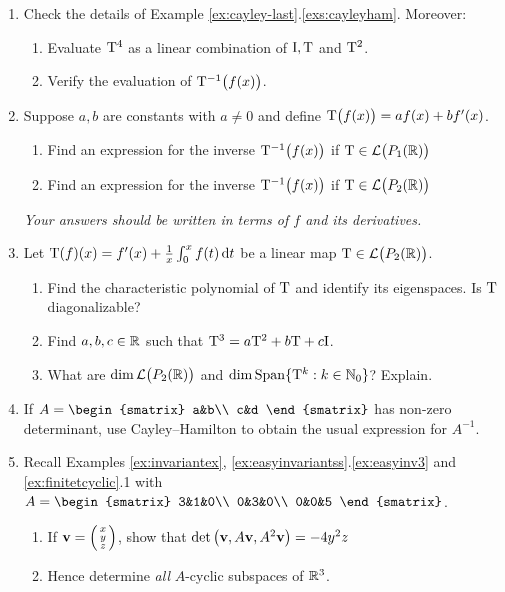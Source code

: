 \begin{exercises}
\begin{enumerate}
	  	
	  \item Check the details of Example \ref*{ex:cayley-last}.\ref{exs:cayleyham}. Moreover:
	  \begin{enumerate}
	    \item Evaluate $\mathrm{T}^4$ as a linear combination of $\mathrm{I},\mathrm{T}$ and $\mathrm{T}^2$.
	    \item Verify the evaluation of $\mathrm{T}^{-1}\big(f(x)\big)$.
	  \end{enumerate}
	  
	  
	  \pagebreak[3]
	  
	  
	  \item Suppose $a,b$ are constants with $a\neq 0$ and define $\mathrm{T}\big(f(x)\big)=af(x)+bf'(x)$.
	  \begin{enumerate}
	    \item Find an expression for the inverse $\mathrm{T}^{-1}\big(f(x)\big)$ if $\mathrm{T}\in\mathcal{L}\big(P_1(\mathbb{R})\big)$
	    \item Find an expression for the inverse $\mathrm{T}^{-1}\big(f(x)\big)$ if $\mathrm{T}\in\mathcal{L}\big(P_2(\mathbb{R})\big)$
	  \end{enumerate}
	  \emph{Your answers should be written in terms of $f$ and its derivatives.}
	  
	  
	  \item Let $\mathrm{T}(f)(x)=f'(x)+\frac 1x\int_0^xf(t)\,{\mathrm{d} t}$ be a linear map $\mathrm{T}\in\mathcal{L}\big(P_2(\mathbb{R})\big)$.
	  \begin{enumerate}
	    \item Find the characteristic polynomial of $\mathrm{T}$ and identify its eigenspaces. Is $\mathrm{T}$ diagonalizable?
	    \item Find $a,b,c\in\mathbb{R}$ such that $\mathrm{T}^3=a\mathrm{T}^2+b\mathrm{T}+c\mathrm{I}$.
	    \item What are $\dim\mathcal{L}\big(P_2(\mathbb{R})\big)$ and $\dim\operatorname{Span}\{\mathrm{T}^k:k\in\mathbb{N}_0\}$? Explain.
	  \end{enumerate} 
	  
	  
	  \item If $A=
	  \begin{smatrix}
	  	a&b\\
	  	c&d
	  \end{smatrix}$ 
	  has non-zero determinant, use Cayley--Hamilton to obtain the usual expression for $A^{-1}$.
	  
	  
	  \item Recall Examples \ref{ex:invariantex}, \ref*{ex:easyinvariantss}.\ref{ex:easyinv3} and \ref*{ex:finitetcyclic}.1 with $A=
	  \begin{smatrix}
			3&1&0\\
			0&3&0\\
			0&0&5
	  \end{smatrix}$.
	  \begin{enumerate}
	    \item If ${\mathbf{v}}=\left(\begin{smallmatrix}x\\y\\z\end{smallmatrix}\right)$, show that $\det\big({\mathbf{v}},A{\mathbf{v}},A^2{\mathbf{v}}\big)=-4y^2z$
			\item Hence determine \emph{all} $A$-cyclic subspaces of $\mathbb{R}^3$.
		\end{enumerate}
		

\end{enumerate}
\end{exercises}
